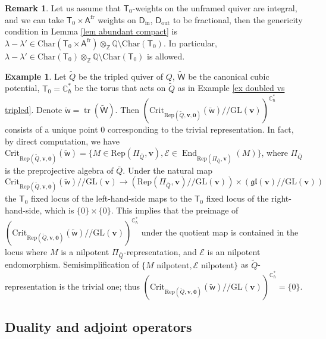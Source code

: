 \documentclass[10pt]{amsart}
\theoremstyle{definition}
\newtheorem{Remark}[Theorem]{Remark}
\newtheorem{Example}[Theorem]{Example}
\numberwithin{equation}{section}
\newcommand{\GL}{\mathrm{GL}}
\newcommand{\Crit}{\mathrm{Crit}}
\newcommand{\bC}{\mathbb{C}}
\newcommand{\bQ}{\mathbb{Q}}
\newcommand{\bZ}{\mathbb{Z}}
\newcommand{\bv}{\mathbf{v}}
\newcommand{\cE}{\mathcal{E}}
\newcommand{\sA}{\mathsf{A}}
\newcommand{\sT}{\mathsf{T}}
\newcommand{\sW}{\mathsf{W}}
\newcommand{\sw}{\mathsf{w}}
\newcommand{\End}{\operatorname{End}}
\newcommand{\tr}{\operatorname{tr}}
\newcommand{\In}{\operatorname{in}}
\newcommand{\Out}{\operatorname{out}}
\begin{document}
\begin{Remark}\label{rmk fractional weights}
Let us assume that $\sT_0$-weights on the unframed quiver are integral, and we can take $\sT_0\times \sA^{\mathrm{fr}}$ weights on $\mathsf D_{\In}$, $\mathsf D_{\Out}$ to be fractional, then the genericity condition in Lemma \ref{lem abundant compact} is $\lambda-\lambda'\in \mathrm{Char}(\sT_0\times \sA^{\mathrm{fr}})\otimes_{\bZ}\bQ\setminus \mathrm{Char}(\sT_0)$. In particular, $\lambda-\lambda'\in \mathrm{Char}(\sT_0)\otimes_{\bZ}\bQ\setminus \mathrm{Char}(\sT_0)$ is allowed.
\end{Remark}


\begin{Example}
Let $\widetilde{Q}$ be the tripled quiver of $Q$, $\widetilde{\sW}$ be the canonical cubic potential, $\sT_0=\bC^*_\hbar$ be the torus that acts on $\widetilde{Q}$ as in Example \ref{ex doubled vs tripled}. Denote $\widetilde{\sw}=\tr(\widetilde{\sW})$. Then $\left(\Crit_{\mathrm{Rep}(\widetilde{Q},\bv,\mathbf 0)}(\widetilde{\sw})/\!\!/ \GL(\bv)\right)^{\bC^*_\hbar}$ consists of a unique point $0$ corresponding to the trivial representation. In fact, by direct computation, we have $\Crit_{\mathrm{Rep}(\widetilde{Q},\bv,\mathbf 0)}(\widetilde{\sw})=\{M\in \mathrm{Rep}(\Pi_{\overline{Q}},\bv), \cE\in \End_{\mathrm{Rep}(\Pi_{\overline{Q}},\bv)}(M)\}$, where $\Pi_{\overline{Q}}$ is the preprojective algebra of $\overline{Q}$. Under the natural map $$\Crit_{\mathrm{Rep}(\widetilde{Q},\bv,\mathbf 0)}(\widetilde{\sw})/\!\!/ \GL(\bv)\longrightarrow \left(\mathrm{Rep}(\Pi_{\overline{Q}},\bv)/\!\!/ \GL(\bv)\right)\times \left(\mathfrak{gl}(\bv)/\!\!/\GL(\bv)\right)$$
the $\sT_0$ fixed locus of the left-hand-side maps to the $\sT_0$ fixed locus of the right-hand-side, which is $\{0\}\times \{0\}$. This implies that the preimage of $\left(\Crit_{\mathrm{Rep}(\widetilde{Q},\bv,\mathbf 0)}(\widetilde{\sw})/\!\!/ \GL(\bv)\right)^{\bC^*_\hbar}$ under the quotient map is contained in the locus where $M$ is a nilpotent $\Pi_{\overline{Q}}$-representation, and $\cE$ is an nilpotent endomorphism. Semisimplification of $\{M\text{ nilpotent}, \cE\text{ nilpotent} \}$ as $\widetilde{Q}$-representation is the trivial one; thus $\left(\Crit_{\mathrm{Rep}(\widetilde{Q},\bv,\mathbf 0)}(\widetilde{\sw})/\!\!/ \GL(\bv)\right)^{\bC^*_\hbar}=\{0\}$.
\end{Example}



\subsection{Duality and adjoint operators}\label{subsec bilinear form}
\end{document}
